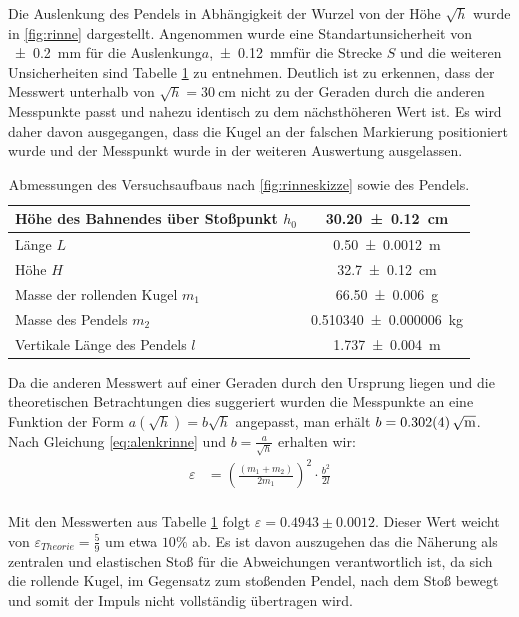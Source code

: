 Die Auslenkung des Pendels in Abhängigkeit der Wurzel von der Höhe $\sqrt{h}$ wurde in \cref{fig:rinne} dargestellt. Angenommen wurde eine Standartunsicherheit von \SI{+-0.2}{mm} für die Auslenkung$a$,\SI{+-0.12}{mm}für die Strecke $S$ und die weiteren Unsicherheiten sind Tabelle \ref{tab:messwrinne} zu entnehmen. Deutlich ist zu erkennen, dass der Messwert unterhalb von $\sqrt{h}=\SI{30}{\centi\metre}$ nicht zu der Geraden durch die anderen Messpunkte passt und nahezu identisch zu dem nächsthöheren Wert ist. Es wird daher davon ausgegangen, dass die Kugel an der falschen Markierung positioniert wurde und der Messpunkt wurde in der weiteren Auswertung ausgelassen.
\begin{table}
	\caption{Abmessungen des Versuchsaufbaus nach \cref{fig:rinneskizze} sowie des Pendels.}

\begin{tabular}{|l|c|}
	\hline 
	Höhe des Bahnendes über Stoßpunkt $h_0$ & \SI{30.20+-0.12}{cm}  \\ 
	\hline 
	Länge $L$ & \SI{0.50+-0.0012}{\metre}  \\ 
		\hline 
	Höhe $H$&  \SI{32.7+-0.12}{\centi \meter}\\ 
	\hline
	Masse der rollenden Kugel $m_1$& \SI{66.50 \pm 0,006}{\gram}  \\ 
	\hline 
	Masse des Pendels $m_2$ & \SI{0.510340+-0.000006}{\kilogram} \\  
	\hline
	Vertikale Länge des Pendels $l$ & \SI{1.737+-0.004}{\metre}  \\ 
	\hline 
\end{tabular} 
\label{tab:messwrinne}
\end{table}
Da die anderen Messwert auf einer Geraden durch den Ursprung liegen und die theoretischen Betrachtungen dies suggeriert wurden die Messpunkte an eine Funktion der Form $a(\sqrt{h})=b \sqrt{h}$ angepasst, man erhält $b=\SI{0.302+-0.004}{\sqrt{\metre}}$. Nach Gleichung \ref{eq:alenkrinne} und $b=\frac{a}{\sqrt{h}}$ erhalten wir:
\begin{align}
\varepsilon&=\left( \frac{(m_1+m_2)}{2m_1} \right) ^2 \cdot \frac{b^2}{2l}\\
\end{align}

Mit den Messwerten aus Tabelle \ref{tab:messwrinne} folgt $\varepsilon = 0.4943 \pm 0.0012$. Dieser Wert weicht von $\varepsilon_{Theorie}=\frac{5}{9}$ um etwa $10\%$ ab. Es ist davon auszugehen das die Näherung als zentralen und elastischen Stoß für die Abweichungen verantwortlich ist, da sich die rollende Kugel, im Gegensatz zum stoßenden Pendel, nach dem Stoß bewegt und somit der Impuls nicht vollständig übertragen wird. 














